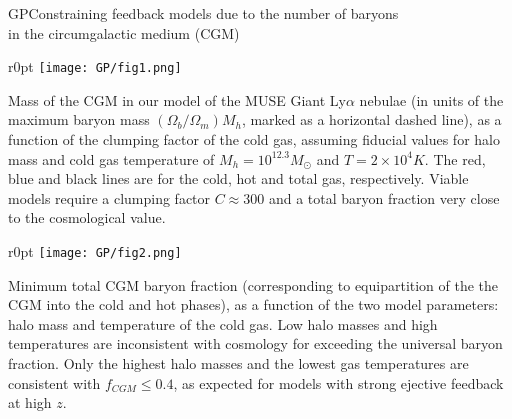 \begin{section}{GP}{Constraining feedback models due to the number of baryons \\
   in the circumgalactic medium (CGM)}
  \begin{minipage}{\linewidth}
    \begin{wrapfigure}{r}{0pt}
      \texttt{[image: GP/fig1.png]}
    \end{wrapfigure}
    \strut {\small Mass of the CGM in our model of the MUSE Giant Ly$\alpha$
      nebulae (in units of the maximum baryon mass $(\Omega_b/\Omega_m)M_h$,
      marked as a horizontal dashed line), as a function of the clumping factor
      of the cold gas, assuming fiducial values for halo mass and cold gas
      temperature of $M_h = 10^{12.3} M_{\odot}$ and $T=2 \times 10^4 K$. The
      red, blue and black lines are for the cold, hot and total gas,
      respectively. Viable models require a clumping factor $C \approx 300$ and
      a total baryon fraction very close to the cosmological value.}
  \end{minipage}

  \vspace{0.7cm}

  \begin{minipage}{\linewidth}
    \begin{wrapfigure}{r}{0pt}
      \texttt{[image: GP/fig2.png]}
    \end{wrapfigure}
    \strut {\small Minimum total CGM baryon fraction (corresponding to
      equipartition of the the CGM into the cold and hot phases), as a function
      of the two model parameters: halo mass and temperature of the cold gas.
      Low halo masses and high temperatures are inconsistent with cosmology for
      exceeding the universal baryon fraction. Only the highest halo masses and
      the lowest gas temperatures are consistent with $f_{CGM} \leq 0.4$, as
      expected for models with strong ejective feedback at high $z$.}
  \end{minipage}
\end{section}